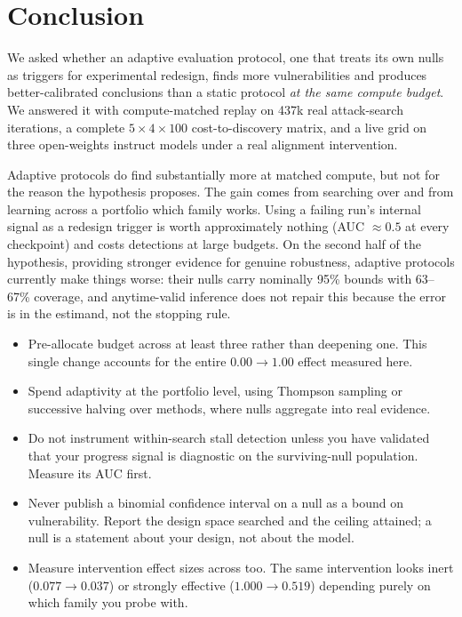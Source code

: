 \section{Conclusion}
\label{sec:conclusion}

We asked whether an adaptive evaluation protocol, one that treats its own nulls as triggers for
experimental redesign, finds more vulnerabilities and produces better-calibrated conclusions than a
static protocol \emph{at the same compute budget}. We answered it with compute-matched replay on
437k real attack-search iterations, a complete $5\times4\times100$ cost-to-discovery matrix, and a
live grid on three open-weights instruct models under a real alignment intervention.

Adaptive protocols do find substantially more at matched compute, but not for the reason the
hypothesis proposes. The gain comes from searching over \families and from learning across a
portfolio which family works. Using a failing run's internal signal as a redesign trigger is worth
approximately nothing (AUC $\approx 0.5$ at every checkpoint) and costs detections at large budgets.
On the second half of the hypothesis, providing stronger evidence for genuine robustness, adaptive
protocols currently make things worse: their nulls carry nominally 95\% bounds with 63--67\%
coverage, and anytime-valid inference does not repair this because the error is in the estimand, not
the stopping rule.

\begin{itemize}[leftmargin=*,itemsep=0pt,topsep=2pt]
    \item Pre-allocate budget across at least three \families rather than deepening one. This single
    change accounts for the entire $0.00 \to 1.00$ effect measured here.
    \item Spend adaptivity at the portfolio level, using Thompson sampling or successive halving
    over methods, where nulls aggregate into real evidence.
    \item Do not instrument within-search stall detection unless you have validated that your
    progress signal is diagnostic on the surviving-null population. Measure its AUC first.
    \item Never publish a binomial confidence interval on a null as a bound on vulnerability. Report
    the design space searched and the ceiling attained; a null is a statement about your design, not
    about the model.
    \item Measure intervention effect sizes across \families too. The same intervention looks inert
    ($0.077 \to 0.037$) or strongly effective ($1.000 \to 0.519$) depending purely on which family
    you probe with.
\end{itemize}

